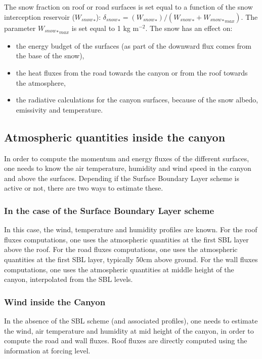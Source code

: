 The snow fraction on roof or road surfaces
is set equal to a function of the snow interception reservoir (${W_{snow}}_*$):
${\delta_{snow}}_*= ({W_{snow}}_*)/({W_{snow}}_*+{{W_{snow}}_*}_{max})$.
The parameter ${{W_{snow}}_*}_{max}$ is set equal to 1 kg m$^{-2}$.
The snow has an effect on:
\begin{itemize}
\item the energy budget of the surfaces (as part
of the downward flux comes from the base of the snow),
\item the heat fluxes from the road towards the canyon or from the roof towards
the atmosphere,
\item the radiative calculations for the canyon surfaces, because
of the snow albedo, emissivity and temperature.
\end{itemize}

\subsection{Atmospheric quantities inside the canyon}

In order to compute the momentum and energy fluxes of the different surfaces, one needs to know the air temperature, humidity and wind speed in the canyon and above the surfaces. Depending if the Surface Boundary Layer scheme is active or not, there are two ways to estimate these. \\

\subsubsection{In the case of the Surface Boundary Layer scheme}

In this case, the wind, temperature and humidity profiles are known. For the roof fluxes computations, one uses the atmospheric quantities at the first SBL layer above the roof.  For the road fluxes computations, one uses the atmospheric quantities at the first SBL layer, typically 50cm above ground. For the wall fluxes computations, one uses the atmospheric quantities at middle height of the canyon, interpolated from the SBL levels. \\


\subsubsection{Wind inside the Canyon}

In the absence of the SBL scheme (and associated profiles), one needs to estimate the wind, air temperature and humidity at mid height of the canyon, in order to compute the road and wall fluxes. Roof fluxes are directly computed using the information at forcing level. \\

